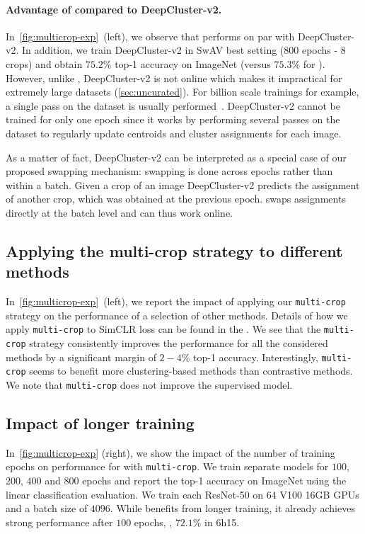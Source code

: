 \paragraph{Advantage of \OURS compared to DeepCluster-v2.}
In~\cref{fig:multicrop-exp}~(left), we observe that \OURS performs on par with DeepCluster-v2.
In addition, we train DeepCluster-v2 in SwAV best setting (800 epochs - 8 crops) and obtain $75.2\%$ top-1 accuracy on ImageNet (versus $75.3\%$ for \OURS).
However, unlike \OURS, DeepCluster-v2 is not online which makes it impractical for extremely large datasets (\cref{sec:uncurated}).
For billion scale trainings for example, a single pass on the dataset is usually performed~\cite{he2019momentum}.
DeepCluster-v2 cannot be trained for only one epoch since it works by performing several passes on the dataset to regularly update centroids and cluster assignments for each image.

As a matter of fact, DeepCluster-v2 can be interpreted as a special case of our proposed swapping mechanism: swapping is done across epochs rather than within a batch.
Given a crop of an image DeepCluster-v2 predicts the assignment of another crop, which was obtained at the previous epoch.
\OURS swaps assignments directly at the batch level and can thus work online.

\subsection{Applying the multi-crop strategy to different methods}
In~\cref{fig:multicrop-exp}~(left), we report the impact of applying our \texttt{multi-crop} strategy on the performance of a selection of other methods.
Details of how we apply \texttt{multi-crop} to SimCLR loss can be found in the \appendixName.
We see that the \texttt{multi-crop} strategy consistently improves the performance for all the considered methods by a significant margin of $2\!-\!4\%$ top-1 accuracy.
Interestingly, \texttt{multi-crop} seems to benefit more clustering-based methods than contrastive methods.
We note that \texttt{multi-crop} does not improve the supervised model.


\subsection{Impact of longer training}
In~\cref{fig:multicrop-exp} (right), we show the impact of the number of training epochs on performance for \OURS with \texttt{multi-crop}.
We train separate models for $100$, $200$, $400$ and $800$ epochs and report the top-1 accuracy on ImageNet using the linear classification evaluation.
We train each ResNet-50 on $64$ V100 16GB GPUs and a batch size of $4096$.
While \OURS benefits from longer training, it already achieves strong performance after $100$ epochs, \ie, $72.1\%$ in 6h15.


